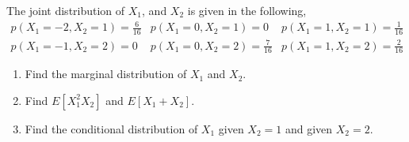 \begin{example}
The joint distribution of $X_1$, and $X_2$ is given in the following,
\[ 
\begin{array}{lll}
     p(X_1 = -2, X_2 = 1) = \frac{6}{16}
    &p(X_1 = 0 , X_2 = 1) = 0
    &p(X_1 = 1 , X_2 = 1) = \frac{1}{16}                                     \\
     p(X_1 = -1, X_2 = 2) = 0
    &p(X_1 = 0 , X_2 = 2) = \frac{7}{16}
    &p(X_1 = 1 , X_2 = 2) = \frac{2}{16}
\end{array}
\]
\begin{enumerate}[noitemsep, topsep=0em]
\item Find the marginal distribution of $X_1$ and $X_2$.
\item Find $E[X_1^{2}X_2]$ and $E[X_1 + X_2]$.
\item Find the conditional distribution of $X_1$ given $X_2 = 1$ and given
      $X_2 = 2$.
\end{enumerate}
\end{example}
